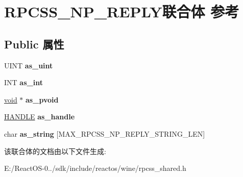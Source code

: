 \hypertarget{union_r_p_c_s_s___n_p___r_e_p_l_y}{}\section{R\+P\+C\+S\+S\+\_\+\+N\+P\+\_\+\+R\+E\+P\+L\+Y联合体 参考}
\label{union_r_p_c_s_s___n_p___r_e_p_l_y}
\subsection*{Public 属性}
\begin{DoxyCompactItemize}
\item 
\mbox{\label{union_r_p_c_s_s___n_p___r_e_p_l_y_a29b5a4cd1867be84ec35d5639945044e}} 
U\+I\+NT {\bfseries as\+\_\+uint}
\item 
\mbox{\label{union_r_p_c_s_s___n_p___r_e_p_l_y_adc6313e2c81daacdf3d6eb935f7d2ab4}} 
I\+NT {\bfseries as\+\_\+int}
\item 
\mbox{\label{union_r_p_c_s_s___n_p___r_e_p_l_y_ae1482f8f3145ce0300940851ff3fe094}} 
\hyperlink{interfacevoid}{void} $\ast$ {\bfseries as\+\_\+pvoid}
\item 
\mbox{\label{union_r_p_c_s_s___n_p___r_e_p_l_y_a8adac49f41a82914c1214cd9c3361208}} 
\hyperlink{interfacevoid}{H\+A\+N\+D\+LE} {\bfseries as\+\_\+handle}
\item 
\mbox{\label{union_r_p_c_s_s___n_p___r_e_p_l_y_a4f41f105b6fa1be88fddf798ad712197}} 
char {\bfseries as\+\_\+string} \mbox{[}M\+A\+X\+\_\+\+R\+P\+C\+S\+S\+\_\+\+N\+P\+\_\+\+R\+E\+P\+L\+Y\+\_\+\+S\+T\+R\+I\+N\+G\+\_\+\+L\+EN\mbox{]}
\end{DoxyCompactItemize}


该联合体的文档由以下文件生成\+:\begin{DoxyCompactItemize}
\item 
E\+:/\+React\+O\+S-\/0../sdk/include/reactos/wine/rpcss\+\_\+shared.\+h\end{DoxyCompactItemize}
